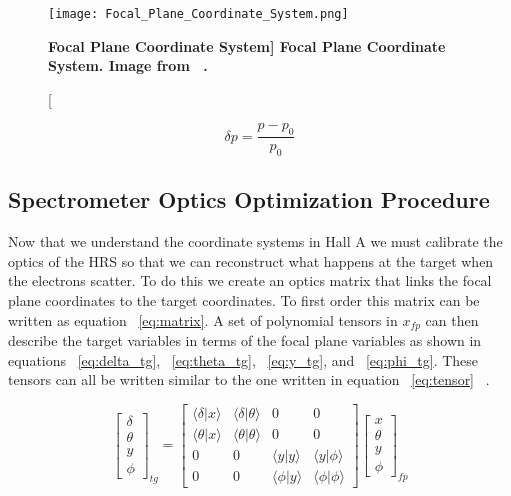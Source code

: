 \begin{figure}[!ht]
\begin{center}
\texttt{[image: Focal\_Plane\_Coordinate\_System.png]}
\end{center}
\caption[\bf{Focal Plane Coordinate System}]{
{\bf{Focal Plane Coordinate System.}} Image from ~\cite{optics}.}
\label{fig:fcs}
\end{figure}

\begin{equation} \label{eq:rel_mom}
	\delta p = \frac{p-p_0}{p_0}
\end{equation}

\subsection{Spectrometer Optics Optimization Procedure}
\label{ssec:optics_optimization} 

Now that we understand the coordinate systems in Hall A we must calibrate the optics of the HRS so that we can reconstruct what happens at the target when the electrons scatter. To do this we create an optics matrix that links the focal plane coordinates to the target coordinates. To first order this matrix can be written as equation ~\ref{eq:matrix}. A set of polynomial tensors in $x_{fp}$ can then describe the target variables in terms of the focal plane variables as shown in equations ~\ref{eq:delta_tg}, ~\ref{eq:theta_tg}, ~\ref{eq:y_tg}, and ~\ref{eq:phi_tg}. These tensors can all be written similar to the one written in equation ~\ref{eq:tensor} ~\cite{optics}.

\begin{equation} \label{eq:matrix}
	\left[ \begin{matrix}
		\delta \\
		\theta \\
		y	   \\
		\phi
	\end{matrix} \right]_{tg}
	=
	\left[ \begin{matrix}
		\langle \delta | x \rangle & \langle \delta | \theta \rangle & 0 & 0 \\
		\langle \theta | x \rangle & \langle \theta | \theta \rangle & 0 & 0 \\
		0 & 0 & \langle y | y \rangle & \langle y | \phi \rangle \\
		0 & 0 & \langle \phi | y \rangle & \langle \phi | \phi \rangle 
	\end{matrix} \right]
		\left[ \begin{matrix}
		x \\
		\theta \\
		y	   \\
		\phi
	\end{matrix} \right]_{fp}
\end{equation}

